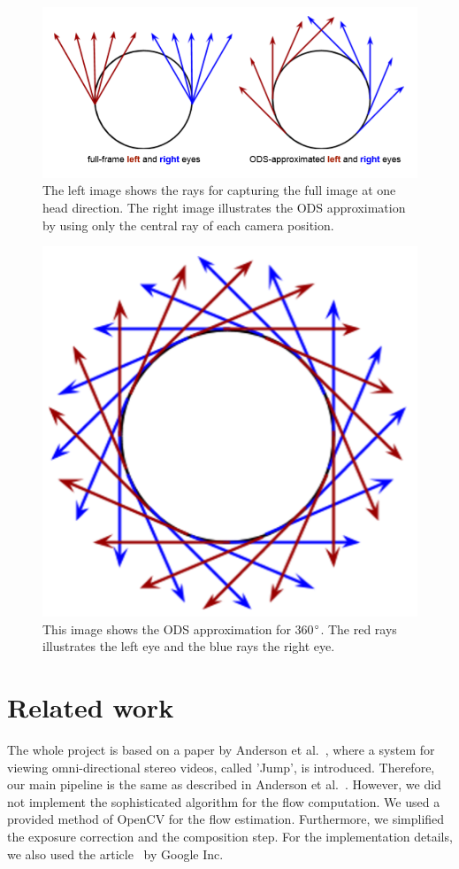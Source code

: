 \documentclass[10pt,twocolumn,letterpaper]{article}
\begin{document}
\begin{figure}[t]
\begin{center}
	\includegraphics[width=0.8\linewidth]{pictures/approxi.png}
\end{center}
   \caption{The left image shows the rays for capturing the full image at one head direction. The right image illustrates the ODS approximation by using only the central ray of each camera position.}
\label{approx}
\end{figure}

\begin{figure}[t]
\begin{center}
   \includegraphics[width=0.5\linewidth]{pictures/ods.png}
\end{center}
   \caption{This image shows the ODS approximation for 360$\degree$. The red rays illustrates the left eye and the blue rays the right eye.}
\label{ods}
\end{figure}


\section{Related work}
The whole project is based on a paper by Anderson et al.~\cite{jump16}, where a system for viewing omni-directional stereo videos, called 'Jump', is introduced. Therefore, our main pipeline is the same as described in Anderson et al.~\cite{jump16}. However, we did not implement the sophisticated algorithm for the flow computation. We used a provided method of OpenCV for the flow estimation. Furthermore, we simplified the exposure correction and the composition step. For the implementation details, we also used the article~\cite{ods} by Google Inc.
\end{document}
